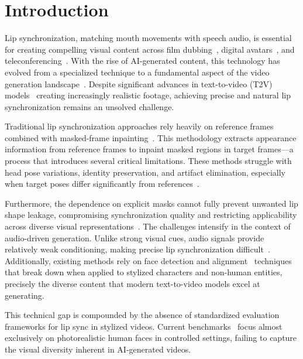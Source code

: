 \section{Introduction}
\vspace{-0.5em}

Lip synchronization, matching mouth movements with speech audio, is essential for creating compelling visual content across film dubbing~\cite{zhang2023dinet}, digital avatars~\cite{peng2023emotalk,peng2023selftalk,zhou2024meta}, and teleconferencing~\cite{meng2024comprehensive,peng2025dualtalk}. With the rise of AI-generated content, this technology has evolved from a specialized technique to a fundamental aspect of the video generation landscape~\cite{yan2021videogpt, singer2022make, liu2024evalcrafter}. Despite significant advances in text-to-video (T2V) models~\cite{chen2023videocrafter1,blattmann2023stable,yang2024cogvideox,kong2024hunyuanvideo,wang2025wan} creating increasingly realistic footage, achieving precise and natural lip synchronization remains an unsolved challenge. 


Traditional lip synchronization approaches rely heavily on reference frames combined with masked-frame inpainting~\cite{prajwal2020lip, zhang2023dinet, guan2023stylesync, guan2024resyncer}. This methodology extracts appearance information from reference frames to inpaint masked regions in target frames—a process that introduces several critical limitations. These methods struggle with head pose variations, identity preservation, and artifact elimination, especially when target poses differ significantly from references~\cite{peng2024synctalk,peng2025synctalk++}. 

Furthermore, the dependence on explicit masks cannot fully prevent unwanted lip shape leakage, compromising synchronization quality and restricting applicability across diverse visual representations~\cite{bigata2025keysync}. The challenges intensify in the context of audio-driven generation. Unlike strong visual cues, audio signals provide relatively weak conditioning, making precise lip synchronization difficult~\cite{wang2024v}. Additionally, existing methods rely on face detection and alignment~\cite{bulat2017far} techniques that break down when applied to stylized characters and non-human entities, precisely the diverse content that modern text-to-video models excel at generating.

This technical gap is compounded by the absence of standardized evaluation frameworks for lip sync in stylized videos. Current benchmarks~\cite{zhang2021flow, wang2020mead} focus almost exclusively on photorealistic human faces in controlled settings, failing to capture the visual diversity inherent in AI-generated videos.

